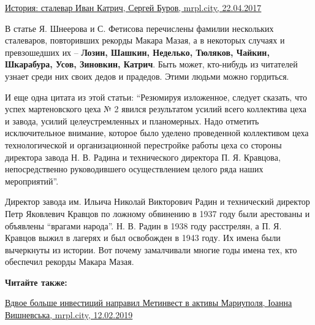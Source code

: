 \href{https://archive.org/details/22_04_2017.sergij_burov.mrpl_city.istoria_stalevar_ivan_katrich}{%
История: сталевар Иван Катрич, Сергей Буров, mrpl.city, 22.04.2017}

В статье Я. Шнеерова и С. Фетисова перечислены фамилии нескольких сталеваров,
повторивших рекорды Макара Мазая, а в некоторых случаях и превзошедших их –
\textbf{Лозин, Шашкин, Неделько, Тюляков, Чайкин, Шкарабура, Усов, Зиновкин, Катрич}.
Быть может, кто-нибудь из читателей узнает среди них своих дедов и прадедов.
Этими людьми можно гордиться.

И еще одна цитата из этой статьи: \enquote{Резюмируя изложенное, следует сказать, что
успех мартеновского цеха № 2 явился результатом усилий всего коллектива цеха и
завода, усилий целеустремленных и планомерных. Надо отметить исключительное
внимание, которое было уделено проведенной коллективом цеха технологической и
организационной перестройке работы цеха со стороны директора завода Н. В. Радина
и технического директора П. Я. Кравцова, непосредственно руководившего
осуществлением целого ряда наших мероприятий}.

Директор завода им. Ильича Николай Викторович Радин и технический директор Петр
Яковлевич Кравцов по ложному обвинению в 1937 году были арестованы и объявлены
\enquote{врагами народа}. Н. В. Радин в 1938 году расстрелян, а П. Я. Кравцов выжил в
лагерях и был освобожден в 1943 году. Их имена были вычеркнуты из истории. Вот
почему замалчивали многие годы имена тех, кто обеспечил рекорды Макара Мазая.

\textbf{Читайте также:}

\href{https://mrpl.city/news/view/vdvoe-bolshe-investitsij-napravil-metinvest-v-aktivy-mariupolyafoto}{%
Вдвое больше инвестиций направил Метинвест в активы Мариуполя, Іоанна Вишневська, mrpl.city, 12.02.2019}

